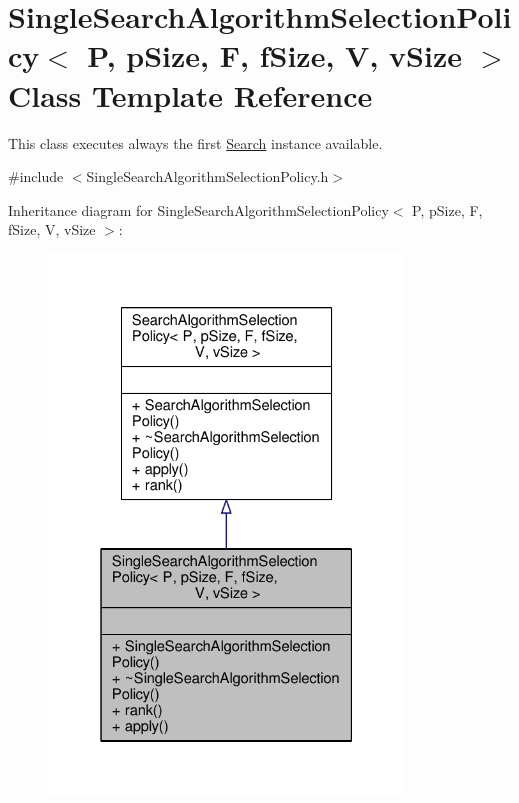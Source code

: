 \hypertarget{classSingleSearchAlgorithmSelectionPolicy}{}\section{Single\+Search\+Algorithm\+Selection\+Policy$<$ P, p\+Size, F, f\+Size, V, v\+Size $>$ Class Template Reference}
\label{classSingleSearchAlgorithmSelectionPolicy}


This class executes always the first \hyperlink{classSearch}{Search} instance available.  




{\ttfamily \#include $<$Single\+Search\+Algorithm\+Selection\+Policy.\+h$>$}



Inheritance diagram for Single\+Search\+Algorithm\+Selection\+Policy$<$ P, p\+Size, F, f\+Size, V, v\+Size $>$\+:
\nopagebreak
\begin{figure}[H]
\begin{center}
\leavevmode
\includegraphics[width=268pt]{classSingleSearchAlgorithmSelectionPolicy__inherit__graph}
\end{center}
\end{figure}


